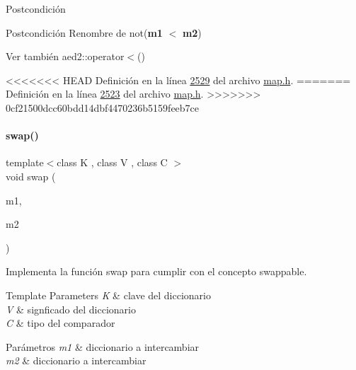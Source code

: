 \begin{DoxyPostcond}{\-Postcondición}
\begin{DoxyPostcond}{\-Postcondición}
Renombre de not({\bfseries m1} $<$ {\bfseries m2}) 

\begin{DoxySeeAlso}{Ver también}
aed2\+::operator$<$() 
\end{DoxySeeAlso}


<<<<<<< HEAD
\-Definición en la línea \hyperlink{map_8h_source_l02529}{2529} del archivo \hyperlink{map_8h_source}{map.\-h}.
=======
Definición en la línea \hyperlink{map_8h_source_l02523}{2523} del archivo \hyperlink{map_8h_source}{map.\+h}.
>>>>>>> 0cf21500dcc60bdd14dbf4470236b5159feeb7ce

\mbox{\label{classaed2_1_1map_a119cb2938bbc11c25ebd4fb824782a72_a119cb2938bbc11c25ebd4fb824782a72}} 
\paragraph{\texorpdfstring{swap()}{swap()}}
{\footnotesize\ttfamily template$<$class K , class V , class C $>$ \\
void swap (\begin{DoxyParamCaption}\item[{\hyperlink{classaed2_1_1map}{map}$<$ K, V, C $>$ \&}]{m1,  }\item[{\hyperlink{classaed2_1_1map}{map}$<$ K, V, C $>$ \&}]{m2 }\end{DoxyParamCaption})\hspace{0.3cm}{\ttfamily [related]}}



Implementa la función swap para cumplir con el concepto swappable. 


\begin{DoxyTemplParams}{Template Parameters}
{\em K} & clave del diccionario \\
\hline
{\em V} & signficado del diccionario \\
\hline
{\em C} & tipo del comparador\\
\hline
\end{DoxyTemplParams}

\begin{DoxyParams}{Parámetros}
{\em m1} & diccionario a intercambiar \\
\hline
{\em m2} & diccionario a intercambiar\\
\hline
\end{DoxyParams}


\end{DoxyPostcond}
\end{DoxyPostcond}
